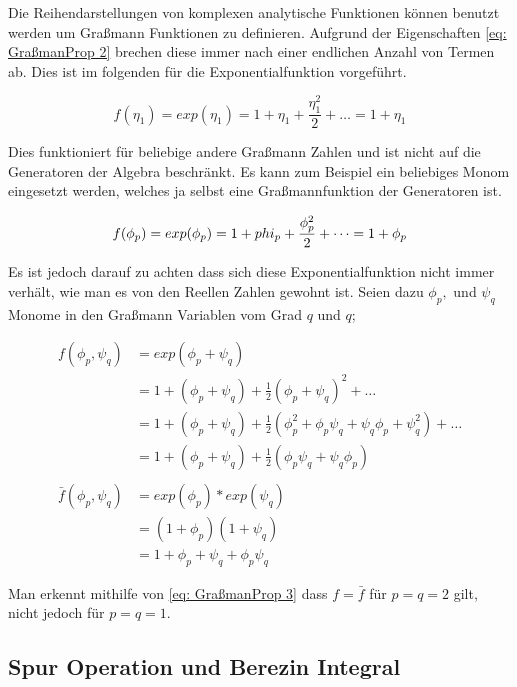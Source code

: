 \noindent Die Reihendarstellungen von komplexen analytische Funktionen können benutzt werden um Graßmann Funktionen zu definieren. Aufgrund der Eigenschaften \eqref{eq: GraßmanProp 2} brechen diese immer nach einer endlichen Anzahl von Termen ab. Dies ist im folgenden für die Exponentialfunktion vorgeführt. 

\begin{equation} \label{eq: exp()}
    f(\eta_1) = exp(\eta_1) = 1 + \eta_1 + \frac{\eta_1^2}{2} + \dots = 1 + \eta_1
\end{equation}

\noindent Dies funktioniert für beliebige andere Graßmann Zahlen und ist nicht auf die Generatoren der Algebra beschränkt. Es kann zum Beispiel ein beliebiges Monom eingesetzt werden, welches ja selbst eine Graßmannfunktion der Generatoren ist. 

\begin{equation} \label{eq: exp()}
    f(\phi_p) = exp(\phi_p) = 1 + \\phi_p + \frac{\phi_p^2}{2} + \dots = 1 + \phi_p
\end{equation}

\noindent Es ist jedoch darauf zu achten dass sich diese Exponentialfunktion nicht immer verhält, wie man es von den Reellen Zahlen gewohnt ist. Seien dazu $\phi_p,$ und $\psi_q$ Monome in den Graßmann Variablen vom Grad $q$ und $q$; 

\begin{align}
    f(\phi_p, \psi_q) 
        &= exp(\phi_p + \psi_q) \nonumber \\
        &= 1 + (\phi_p + \psi_q) + \frac{1}{2}(\phi_p + \psi_q)^2 + \dots \nonumber\\
        &= 1 + (\phi_p + \psi_q) + \frac{1}{2}(\phi_p^2 + \phi_p\psi_q +\psi_q\phi_p + \psi_q^2) + \dots \nonumber\\
     &= 1 + (\phi_p + \psi_q) + \frac{1}{2}( \phi_p\psi_q +\psi_q\phi_p) \\
    \nonumber \\
    \bar{f}(\phi_p, \psi_q) 
        &= exp(\phi_p)*exp(\psi_q) \nonumber \\
        &= (1 + \phi_p)(1 +\psi_q) \nonumber \\
    &= 1+  \phi_p + \psi_q + \phi_p\psi_q 
\end{align}

\noindent Man erkennt mithilfe von \eqref{eq: GraßmanProp 3} dass $f = \bar f$ für $p=q = 2$ gilt, nicht jedoch für $ p = q = 1 $.

\subsection{Spur Operation und Berezin Integral}

